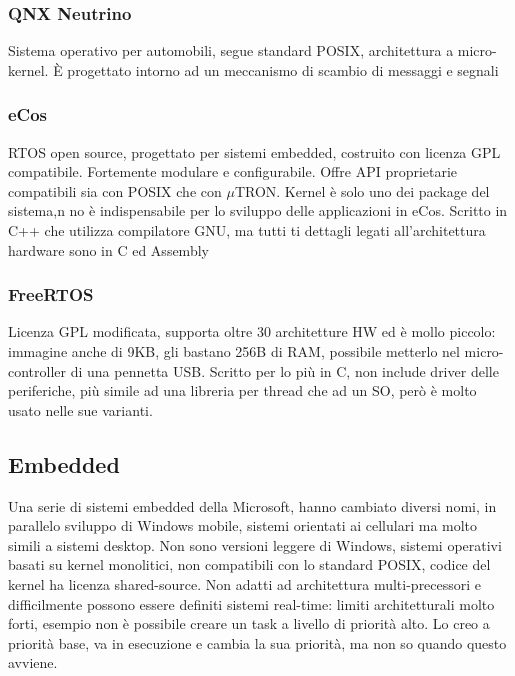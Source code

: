 \documentclass[12pt, oneside]{extbook}
\begin{document}
\subsubsection{QNX Neutrino}
Sistema operativo per automobili, segue standard POSIX, architettura a micro-kernel. È progettato intorno ad un meccanismo di scambio di messaggi e segnali
\subsubsection{eCos}
RTOS open source, progettato per sistemi embedded, costruito con licenza GPL compatibile. Fortemente modulare e configurabile. Offre API proprietarie compatibili sia con POSIX che con $\mu$TRON. Kernel è solo uno dei package del sistema,n no è indispensabile per lo sviluppo delle applicazioni in eCos. Scritto in C++ che utilizza compilatore GNU, ma tutti ti dettagli legati all'architettura hardware sono in C ed Assembly
\subsubsection{FreeRTOS}
Licenza GPL modificata, supporta oltre 30 architetture HW ed è mollo piccolo: immagine anche di 9KB, gli bastano 256B di RAM, possibile metterlo nel micro-controller di una pennetta USB. Scritto per lo più in C, non include driver delle periferiche, più simile ad una libreria per thread che ad un SO, però è molto usato nelle sue varianti.
\subsection{Embedded}
Una serie di sistemi embedded della Microsoft, hanno cambiato diversi nomi, in parallelo sviluppo di Windows mobile, sistemi orientati ai cellulari ma molto simili a sistemi desktop. Non sono versioni leggere di Windows, sistemi operativi basati su kernel monolitici, non compatibili con lo standard POSIX, codice del kernel ha licenza shared-source. Non adatti ad architettura multi-precessori e difficilmente possono essere definiti sistemi real-time: limiti architetturali molto forti, esempio non è possibile creare un task a livello di priorità alto. Lo creo a priorità base, va in esecuzione e cambia la sua priorità, ma non so quando questo avviene.
\end{document}

